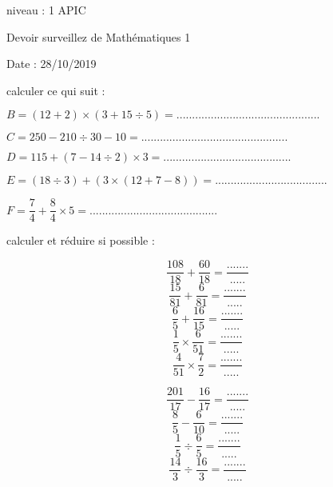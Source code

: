\documentclass[addpoints]{exam}
\begin{document}
\begin{tcolorbox}
\begin{minipage}{0.2\linewidth}
niveau : 1 APIC
\end{minipage}\hfill
\begin{minipage}{0.5\linewidth}
Devoir surveillez de Mathématiques 1
\end{minipage}\hfill
\begin{minipage}{0.3\linewidth}
Date : 28/10/2019
\end{minipage}
\end{tcolorbox}
	
	
\begin{tcolorbox}[title=Exercice 1]
	\begin{questions}
		\question calculer ce qui suit :

$ B=(12+2)\times( 3+15\div 5)= ..............................................$\vspace{0.3cm}

$ C=250-210\div 30-10= ...............................................$\vspace{0.3cm}

$ D=115+(7-14\div 2)\times 3=.........................................$\vspace{0.3cm}

$ E=(18\div 3)+(3\times(12+7-8))=....................................$

$ F=\dfrac{7}{4}+\dfrac{8}{4}\times 5 =......................................... $
		
	\end{questions}
\end{tcolorbox}

	
\begin{tcolorbox}[title=Exercice 2]
	\begin{questions}
		\question calculer et réduire si possible :
		
\begin{minipage}{0.4\linewidth}
\[\dfrac{108}{18}+\dfrac{60}{18}=\dfrac{.......}{.....}\]
\[\dfrac{15}{81}+\dfrac{6}{81}=\dfrac{.......}{.....}\]
\[\dfrac{6}{5}+\dfrac{16}{15}=\dfrac{.......}{.....}\]
\[\dfrac{1}{5}\times \dfrac{6}{51}=\dfrac{.......}{.....}\]
\[\dfrac{4}{51}\times\dfrac{7}{2}=\dfrac{.......}{.....}\]

\end{minipage}
\begin{minipage}{0.4\linewidth}
\[\dfrac{201}{17}-\dfrac{16}{17}=\dfrac{.......}{.....}\]
\[\dfrac{8}{5}-\dfrac{6}{10}=\dfrac{.......}{.....}\]
\[\dfrac{1}{5}\div\dfrac{6}{5}=\dfrac{.......}{.....}\]
\[\dfrac{14}{3}\div\dfrac{16}{3}=\dfrac{.......}{.....}\]
\end{minipage}		
	\end{questions}
\end{tcolorbox}
\end{document}
